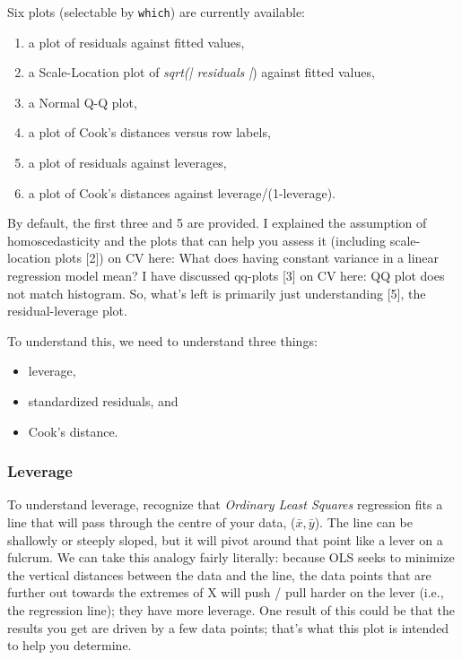 \documentclass[main.tex]{subfiles}
\begin{document}
Six plots (selectable by \texttt{which}) are currently available: 
\begin{enumerate}
\item a plot of residuals against fitted values, 
\item a Scale-Location plot of \textit{sqrt(| residuals |}) against fitted values, 
\item a Normal Q-Q plot, 
\item a plot of Cook's distances versus row labels, 
\item a plot of residuals against leverages, 
\item a plot of Cook's distances against leverage/(1-leverage).
\end{enumerate} By default, the first three and 5 are provided.
\newpage
 I explained the assumption of homoscedasticity and the plots that can help you assess it (including scale-location plots [2]) on CV here: What does having constant variance in a linear regression model mean? I have discussed qq-plots [3] on CV here: QQ plot does not match histogram. So, what's left is primarily just understanding [5], the residual-leverage plot.

To understand this, we need to understand three things:

\begin{itemize}
\item leverage,
\item standardized residuals, and
\item Cook's distance.
\end{itemize}
\subsubsection{Leverage}
To understand leverage, recognize that \textit{Ordinary Least Squares} regression fits a line that will pass through the centre of your data, ($\bar{x}, \bar{y}$). The line can be shallowly or steeply sloped, but it will pivot around that point like a lever on a fulcrum. We can take this analogy fairly literally: because OLS seeks to minimize the vertical distances between the data and the line, the data points that are further out towards the extremes of X will push / pull harder on the lever (i.e., the regression line); they have more leverage. One result of this could be that the results you get are driven by a few data points; that's what this plot is intended to help you determine.
\end{document}
